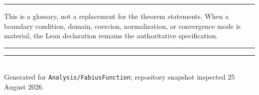 \documentclass[11pt,oneside]{article}
\theoremstyle{definition}
\theoremstyle{remark}
\newenvironment{boxedremark}{%
  \par\smallskip\noindent\begin{center}\begin{minipage}{0.94\textwidth}%
  \color{black}\hrule\vspace{0.6em}\small
}{%
  \vspace{0.6em}\hrule\end{minipage}\end{center}\smallskip
}
\begin{document}
\begin{boxedremark}
This is a glossary, not a replacement for the theorem statements.  When a
boundary condition, domain, coercion, normalization, or convergence mode is
material, the Lean declaration remains the authoritative specification.
\end{boxedremark}

\vfill
\begin{center}
\textcolor{rulegray}{\rule{0.72\textwidth}{0.6pt}}\\[0.7em]
{\small Generated for \texttt{Analysis/FabiusFunction}; repository snapshot
inspected 25 August 2026.}
\end{center}
\end{document}
